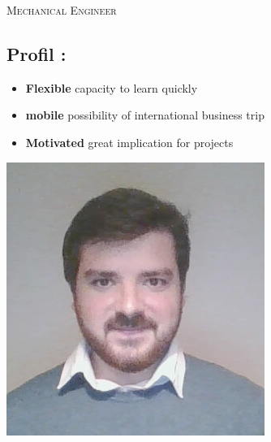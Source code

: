 \documentclass[10pt,a4paper,sans]{article}
\begin{document}

\begin{minipage}{0.36\textwidth}
    \vspace{0.30cm}
    
\end{minipage}
\begin{minipage}{0.62\textwidth}
    \begin{mdframed}[style=titre1]
        \begin{flushright}
            \LARGE{\textsc{Mechanical Engineer}}

        \end{flushright}
    \end{mdframed}
    \begin{minipage}{0.75\textwidth}
        \subsection{\large{Profil :}}
        \begin{itemize}
            \item{\textbf{Flexible} capacity to learn quickly}
            \item{\textbf{mobile} possibility of international business trip}
            \item{\textbf{Motivated} great implication for projects}
        \end{itemize}
    \end{minipage}
    \begin{minipage}{0.23\textwidth}
        \includegraphics[width=\textwidth]{img/image_CV.png}
    \end{minipage}
\end{minipage}
\end{document}
